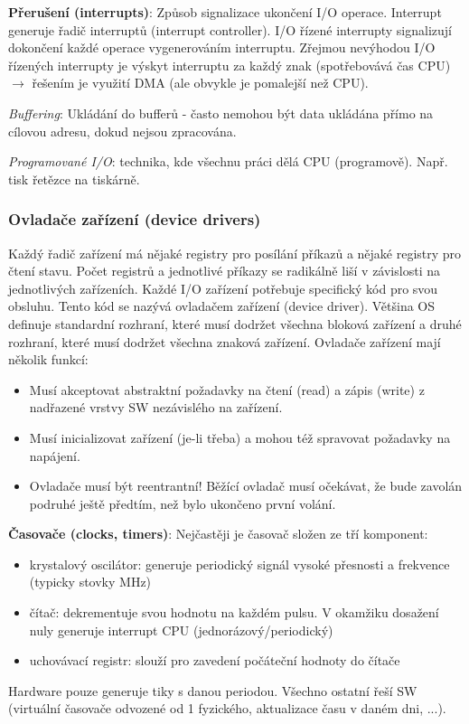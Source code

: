 \textbf{Přerušení (interrupts)}: Způsob signalizace ukončení I/O operace. Interrupt generuje řadič interruptů (interrupt controller). I/O řízené interrupty signalizují dokončení každé operace vygenerováním interruptu. Zřejmou nevýhodou I/O řízených interrupty je výskyt interruptu za každý znak (spotřebovává čas CPU) $ \to $ řešením je využití DMA (ale obvykle je pomalejší než CPU).

\textit{Buffering}: Ukládání do bufferů - často nemohou být data ukládána přímo na cílovou adresu, dokud nejsou zpracována.

\textit{Programované I/O}: technika, kde všechnu práci dělá CPU (programově). Např. tisk řetězce na tiskárně.

\subsubsection*{Ovladače zařízení (device drivers)}
Každý řadič zařízení má nějaké registry pro posílání příkazů a nějaké registry pro čtení stavu. Počet registrů a jednotlivé příkazy se radikálně liší v závislosti na jednotlivých zařízeních. Každé I/O zařízení potřebuje specifický
kód pro svou obsluhu. Tento kód se nazývá ovladačem zařízení (device driver). Většina OS definuje standardní rozhraní, které musí dodržet všechna bloková zařízení a druhé rozhraní, které musí dodržet všechna znaková zařízení. Ovladače zařízení mají několik funkcí:
\begin{itemize}
\item Musí akceptovat abstraktní požadavky na čtení (read) a zápis (write) z nadřazené vrstvy SW nezávislého na zařízení.
\item Musí inicializovat zařízení (je-li třeba) a mohou též spravovat požadavky na napájení.
\item Ovladače musí být reentrantní! Běžící ovladač musí očekávat, že bude zavolán podruhé ještě předtím, než bylo ukončeno první volání.
\end{itemize}

\textbf{Časovače (clocks, timers)}: Nejčastěji je časovač složen ze tří komponent:
\begin{itemize}
\item krystalový oscilátor: generuje periodický signál vysoké přesnosti a frekvence (typicky stovky MHz)
\item čítač: dekrementuje svou hodnotu na každém pulsu. V okamžiku dosažení nuly generuje interrupt CPU (jednorázový/periodický)
\item uchovávací registr: slouží pro zavedení počáteční hodnoty do čítače
\end{itemize}
Hardware pouze generuje tiky s danou periodou. Všechno ostatní řeší SW (virtuální časovače odvozené od 1 fyzického, aktualizace času v daném dni, ...).

